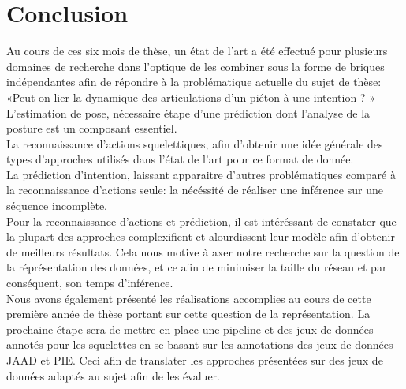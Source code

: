\clearpage
\chapter{Conclusion}
\label{sec:SOTA}

Au cours de ces six mois de thèse, un état de l'art a été effectué pour plusieurs domaines de recherche dans l'optique de les combiner sous la forme de briques indépendantes afin de répondre à la problématique actuelle du sujet de thèse: «Peut-on lier la dynamique des articulations d'un piéton à une intention ? »\\

L'estimation de pose, nécessaire étape d'une prédiction dont l'analyse de la posture est un composant essentiel.\\
La reconnaissance d'actions squelettiques, afin d'obtenir une idée générale des types d'approches utilisés dans l'état de l'art pour ce format de donnée.\\
La prédiction d'intention, laissant apparaitre d'autres problématiques comparé à la reconnaissance d'actions seule: la nécéssité de réaliser une inférence sur une séquence incomplète.\\

Pour la reconnaissance d'actions et prédiction, il est intéréssant de constater que la plupart des approches complexifient et alourdissent leur modèle afin d'obtenir de meilleurs résultats. Cela nous motive à axer notre recherche sur la question de la réprésentation des données, et ce afin de minimiser la taille du réseau et par conséquent, son temps d'inférence.\\

Nous avons également présenté les réalisations accomplies au cours de cette première année de thèse portant sur cette question de la représentation. La prochaine étape sera de mettre en place une pipeline et des jeux de données annotés pour les squelettes en se basant sur les annotations des jeux de données JAAD et PIE. Ceci afin de translater les approches présentées sur des jeux de données adaptés au sujet afin de les évaluer.